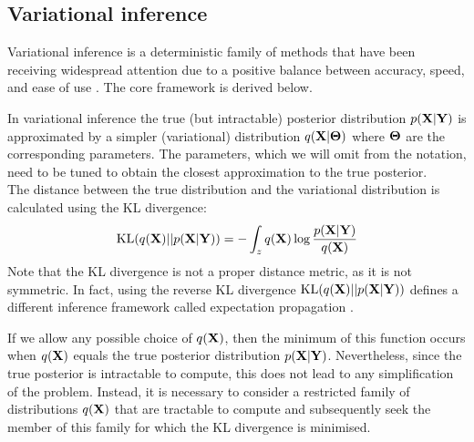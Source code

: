 \subsection{Variational inference}  \label{section:variational_inference}

Variational inference is a deterministic family of methods that have been receiving widespread attention due to a positive balance between accuracy, speed, and ease of use \cite{Blei2016, Zhang2017}. The core framework is derived below.

In variational inference the true (but intractable) posterior distribution $p({\bf X}|{\bf Y})$ is approximated by a simpler (variational) distribution $q({\bf X}|\mbox{\boldmath $\Theta$})$ where $\mbox{\boldmath $\Theta$}$ are the corresponding parameters. The parameters, which we will omit from the notation, need to be tuned to obtain the closest approximation to the true posterior.\\
The distance between the true distribution and the variational distribution is calculated using the KL divergence:
\[
{\rm KL}(q({\bf X})||p({\bf X}|{\bf Y})) = - \int_z q({\bf X}) \log \frac{p({\bf X}|{\bf Y})}{q({\bf X})}
\]
Note that the KL divergence is not a proper distance metric, as it is not symmetric. In fact, using the reverse KL divergence ${\rm KL}(q({\bf X})||p({\bf X}|{\bf Y}))$ defines a different inference framework called expectation propagation \cite{Minka2001}.

If we allow any possible choice of $q({\bf X})$, then the minimum of this function occurs when $q({\bf X})$ equals the true posterior distribution $p({\bf X}|{\bf Y})$. Nevertheless, since the true posterior is intractable to compute, this does not lead to any simplification of the problem. Instead, it is necessary to consider a restricted family of distributions $q({\bf X})$ that are tractable to compute and subsequently seek the member of this family for which the KL divergence is minimised.


